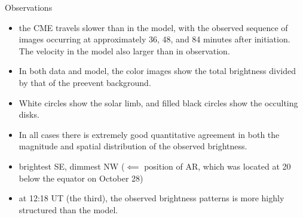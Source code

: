 \documentclass{beamer}
\begin{document}
\begin{frame}{Observations}
\begin{itemize}
\item the CME travels slower than in the model, with
the observed sequence of images occurring at approximately 36,
48, and 84 minutes after initiation. The velocity in the model also larger than in observation.
\item In both data and model, the
color images show the total brightness divided by that of the preevent
background.  
\item White circles show the solar limb, and filled
black circles show the occulting disks.
\item In all cases there is  extremely
good quantitative agreement in both the magnitude and spatial distribution
of the observed brightness.
\item brightest SE, dimmest NW ($\impliedby$  position of AR, which was
located at 20 below the equator on October 28)
\item at 12:18 UT (the third), the
observed brightness patterns is more highly structured than the
model.
\end{itemize}
\end{frame}
\end{document}
